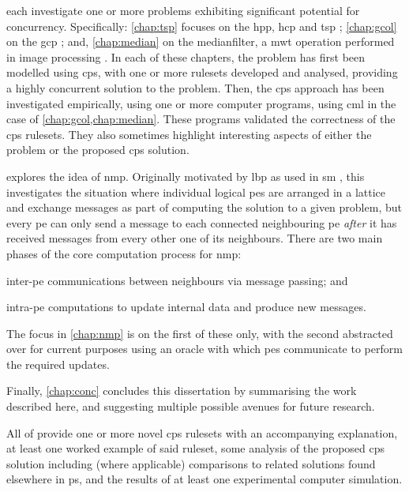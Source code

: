  each investigate one or more problems exhibiting significant potential for concurrency.  Specifically: \cref{chap:tsp} focuses on the \gls{hpp}, \gls{hcp} and \gls{tsp} \cite{Applegate2006,Cook2012}; \cref{chap:gcol} on the \gls{gcp} \cite{Lewis2016}; and, \cref{chap:median} on the \gls{medianfilter}, a \gls{mwt} operation performed in image processing \cite{Fisher2016,Gimelfarb2018}.  In each of these chapters, the problem has first been modelled using \gls{cps}, with one or more \glspl{ruleset} developed and analysed, providing a highly concurrent solution to the problem.  Then, the \gls{cps} approach has been investigated empirically, using one or more computer programs, using \gls{cml} in the case of \cref{chap:gcol,chap:median}.  These programs validated the correctness of the \gls{cps} \glspl{ruleset}.  They also sometimes highlight interesting aspects of either the problem or the proposed \gls{cps} solution.

 explores the idea of \gls{nmp}.  Originally motivated by \gls{lbp} \cite{Sun2003,Felzenszwalb2006,Felzenszwalb2011} as used in \gls{sm} \cite{Sinha2020,Tippetts2016,Scharstein2002}, this  investigates the situation where individual logical \glspl{pe} are arranged in a lattice and exchange messages as part of computing the solution to a given problem, but every \gls{pe} can only send a message to each connected neighbouring \gls{pe} \emph{after} it has received messages from every other one of its neighbours.  There are two main phases of the core computation process for \gls{nmp}:
\begin{inparaenum}[a)]
\item inter-\gls{pe} communications between neighbours via message passing; and
\item intra-\gls{pe} computations to update internal data and produce new messages.
\end{inparaenum}  The focus in \cref{chap:nmp} is on the first of these only, with the second abstracted over for current purposes using an oracle with which \glspl{pe} communicate to perform the required updates.

Finally, \cref{chap:conc} concludes this dissertation by summarising the work described here, and suggesting multiple possible avenues for future research.

All of  provide one or more novel \gls{cps} \glspl{ruleset} with an accompanying explanation, at least one worked example of said \gls{ruleset}, some analysis of the proposed \gls{cps} solution including (where applicable) comparisons to related solutions found elsewhere in \gls{ps}, and the results of at least one experimental computer simulation.

